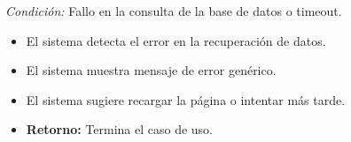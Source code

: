 \begin{appendices}
\begin{itemize}[leftmargin=*]
    \textit{Condición:} Fallo en la consulta de la base de datos o timeout.
    \begin{itemize}[nosep]
        \item[D-1:] El sistema detecta el error en la recuperación de datos.
        \item[D-2:] El sistema muestra mensaje de error genérico.
        \item[D-3:] El sistema sugiere recargar la página o intentar más tarde.
        \item \textbf{Retorno:} Termina el caso de uso.
    \end{itemize}
\end{itemize}

\end{appendices}